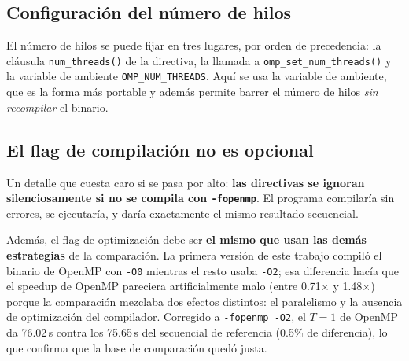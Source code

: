 \subsection{Configuración del número de hilos}

El número de hilos se puede fijar en tres lugares, por orden de precedencia: la cláusula \texttt{num\_threads()} de la directiva, la llamada a \texttt{omp\_set\_num\_threads()} y la variable de ambiente \texttt{OMP\_NUM\_THREADS}. Aquí se usa la variable de ambiente, que es la forma más portable y además permite barrer el número de hilos \emph{sin recompilar} el binario.

\subsection{El flag de compilación no es opcional}

Un detalle que cuesta caro si se pasa por alto: \textbf{las directivas se ignoran silenciosamente si no se compila con \texttt{-fopenmp}}. El programa compilaría sin errores, se ejecutaría, y daría exactamente el mismo resultado secuencial.

Además, el flag de optimización debe ser \textbf{el mismo que usan las demás estrategias} de la comparación. La primera versión de este trabajo compiló el binario de OpenMP con \texttt{-O0} mientras el resto usaba \texttt{-O2}; esa diferencia hacía que el speedup de OpenMP pareciera artificialmente malo (entre 0.71$\times$ y 1.48$\times$) porque la comparación mezclaba dos efectos distintos: el paralelismo y la ausencia de optimización del compilador. Corregido a \texttt{-fopenmp -O2}, el $T=1$ de OpenMP da 76.02\,s contra los 75.65\,s del secuencial de referencia (0.5\% de diferencia), lo que confirma que la base de comparación quedó justa.

